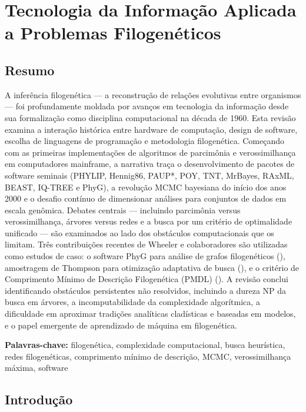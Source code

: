 
\chapter{Tecnologia da Informação Aplicada a Problemas Filogenéticos}

\section*{Resumo}

A inferência filogenética --- a reconstrução de relações evolutivas entre organismos --- foi profundamente moldada por avanços em tecnologia da informação desde sua formalização como disciplina computacional na década de 1960. Esta revisão examina a interação histórica entre hardware de computação, design de software, escolha de linguagens de programação e metodologia filogenética. Começando com as primeiras implementações de algoritmos de parcimônia e verossimilhança em computadores mainframe, a narrativa traça o desenvolvimento de pacotes de software seminais (PHYLIP, Hennig86, PAUP*, POY, TNT, MrBayes, RAxML, BEAST, IQ-TREE e PhyG), a revolução MCMC bayesiana do início dos anos 2000 e o desafio contínuo de dimensionar análises para conjuntos de dados em escala genômica. Debates centrais --- incluindo parcimônia versus verossimilhança, árvores versus redes e a busca por um critério de optimalidade unificado --- são examinados ao lado dos obstáculos computacionais que os limitam. Três contribuições recentes de Wheeler e colaboradores são utilizadas como estudos de caso: o software PhyG para análise de grafos filogenéticos (\textcite{wheeler2024a}), amostragem de Thompson para otimização adaptativa de busca (\textcite{wheeler2024}), e o critério de Comprimento Mínimo de Descrição Filogenética (PMDL) (\textcite{wheeler2025}). A revisão conclui identificando obstáculos persistentes não resolvidos, incluindo a dureza NP da busca em árvores, a incomputabilidade da complexidade algorítmica, a dificuldade em aproximar tradições analíticas cladísticas e baseadas em modelos, e o papel emergente de aprendizado de máquina em filogenética.

\textbf{Palavras-chave:} filogenética, complexidade computacional, busca heurística, redes filogenéticas, comprimento mínimo de descrição, MCMC, verossimilhança máxima, software

\section{Introdução}

